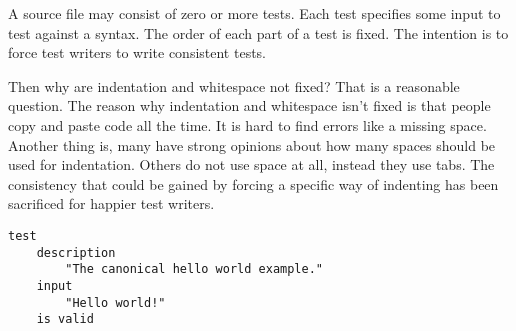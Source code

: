 

A source file may consist of zero or more tests. Each test specifies some input
to test against a syntax. The order of each part of a test is fixed. The
intention is to force test writers to write consistent tests.
\clearpage

Then why are indentation and whitespace not fixed? That is a reasonable 
question. The reason why indentation and whitespace isn't fixed is that people 
copy and paste code all the time. It is hard to find errors like a missing 
space. Another thing is, many have strong opinions about how many spaces should
be used for indentation. Others do not use space at all, instead they use tabs.
The consistency that could be gained by forcing a specific way of indenting 
has been sacrificed for happier test writers.

\begin{lstlisting}[style = SrtL]
test
    description
        "The canonical hello world example."
    input 
        "Hello world!"
    is valid
\end{lstlisting}